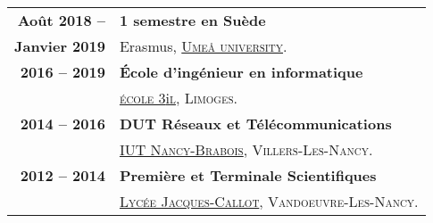 \begin{supertabular}{rl}
    \textbf{Ao\^ut 2018 --} & \textbf{1 semestre en Su\`ede}\\
    \textbf{Janvier 2019} & Erasmus, \href{https://www.umu.se/en}{\textsc{Umeå university}}.\\[1.5ex]
    \textbf{2016 -- 2019} & \textbf{\'Ecole d'ing\'enieur en informatique}\\
    & \href{https://www.3il-ingenieurs.fr/en}{\textsc{\'ecole 3}i\textsc{l}}, \textsc{Limoges}.\\[1.5ex]
    \textbf{2014 -- 2016} & \textbf{DUT R\'eseaux et T\'el\'ecommunications}\\
    & \href{https://iutnb.univ-lorraine.fr/fr/content/rt-dut}{\textsc{IUT Nancy-Brabois}}, \textsc{Villers-Les-Nancy}.\\[1.5ex]
    \textbf{2012 -- 2014} & \textbf{Premi\`ere et Terminale Scientifiques}\\
    & \href{http://www4.ac-nancy-metz.fr/lyc-jacques-callot}{\textsc{Lyc\'ee Jacques-Callot}}, \textsc{Vandoeuvre-Les-Nancy}.\\
\end{supertabular}

\medskip
